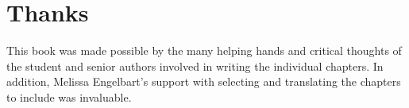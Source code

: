 \documentclass[
  letterpaper,
]{book}
\begin{document}

\chapter*{\texorpdfstring{{Thanks}}{Thanks}}\label{thanks}


This book was made possible by the many helping hands and critical
thoughts of the student and senior authors involved in writing the
individual chapters. In addition, Melissa Engelbart's support with
selecting and translating the chapters to include was invaluable.


\backmatter
\end{document}
